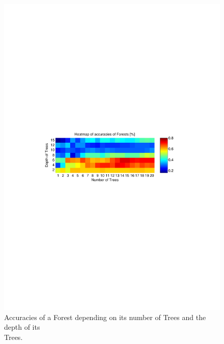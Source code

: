 \documentclass[twocolumn]{article}
\begin{document}
\onecolumn
\begin{figure}[t] 
\centering
\includegraphics[width=\textwidth]{Diagrams/Forests_Heatmap_Gini_15_20}
\caption{Accuracies of a Forest depending on its number of Trees and the depth of its\\\phantom{Figure 1: }Trees.}
\label{forest_heatmap}
\end{figure}
\end{document}
